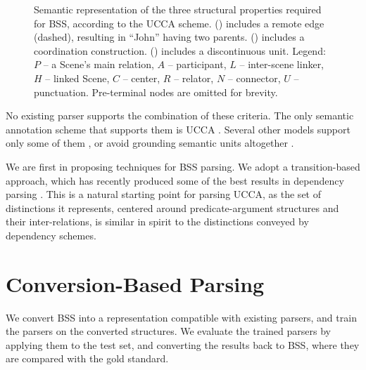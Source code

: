 \documentclass[11pt]{article}
\begin{document}
\begin{figure}[ht]
\begin{subfigure}[ht]{.23\textwidth}
{
  }
  \caption{}\label{fig:gave}
  \end{subfigure}
  \caption{\label{fig:examples}\footnotesize
    Semantic representation of the three structural properties
    required for BSS, according to the UCCA scheme. () includes a remote edge (dashed),
    resulting in ``John'' having two parents.
    () includes a coordination construction.
    () includes a discontinuous unit.
    Legend: $P$ -- a Scene's main relation, $A$ -- participant,
    $L$ -- inter-scene linker, $H$ -- linked Scene, $C$ -- center,
    $R$ -- relator, $N$ -- connector, $U$ -- punctuation.
    Pre-terminal nodes are omitted for brevity.
  }
\end{figure}

No existing parser supports the combination of these criteria.
The only semantic annotation scheme that supports them is UCCA \cite{abend2013universal}.
Several other models support only some of them \cite{oepen2015semeval},
or avoid grounding semantic units altogether \cite{banarescu2013abstract}.

We are first in proposing techniques for BSS parsing.
We adopt a transition-based approach, which has recently produced some of the best
results in dependency parsing \cite{dyer2015transition}.
This is a natural starting point for parsing UCCA, as
the set of distinctions it represents, centered around predicate-argument
structures and their inter-relations, is similar in spirit to the distinctions
conveyed by dependency schemes.


\section{Conversion-Based Parsing}\label{sec:conversion_approach}

We convert BSS into a representation compatible with existing parsers,
and train the parsers on the converted structures.
We evaluate the trained parsers by applying them to the test set,
and converting the results back to BSS, where they are compared
with the gold standard.
\end{document}
